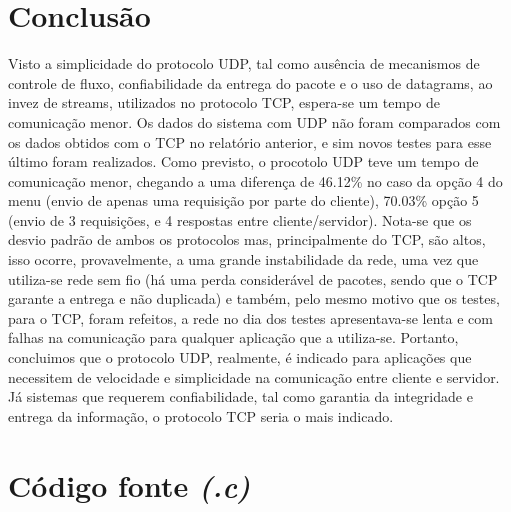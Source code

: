 \documentclass[a4paper,10pt]{article}
\begin{document}
\section{Conclusão}
Visto a simplicidade do protocolo UDP, tal como ausência de mecanismos de controle de fluxo, confiabilidade da entrega do pacote e o uso de datagrams, ao invez de 
streams, utilizados no protocolo TCP, espera-se um tempo de comunicação menor. Os dados do sistema com UDP não foram comparados com os dados obtidos com o TCP no 
relatório anterior, e sim novos testes para esse último foram realizados. Como previsto, o procotolo UDP teve um tempo de comunicação menor, chegando a uma 
diferença de 46.12\% no caso da opção 4 do menu (envio de apenas uma requisição por parte do cliente), 70.03\% opção 5 (envio de 3 requisições, e 4 respostas entre cliente/servidor). Nota-se que os desvio padrão de ambos os protocolos mas, principalmente do TCP, são altos, isso ocorre, provavelmente, a uma grande instabilidade
da rede, uma vez que utiliza-se rede sem fio (há uma perda considerável de pacotes, sendo que o TCP garante a entrega e não duplicada) e também, pelo mesmo motivo 
que os testes, para o TCP, foram refeitos, a rede no dia dos testes apresentava-se lenta e com falhas na comunicação para qualquer aplicação que a utiliza-se.
Portanto, concluimos que o protocolo UDP, realmente, é indicado para aplicações que necessitem de velocidade e simplicidade na comunicação entre cliente e servidor.
Já sistemas que requerem confiabilidade, tal como garantia da integridade e entrega da informação, o protocolo TCP seria o mais indicado.
\newpage
\section{Código fonte \textit{(.c)}}
\end{document}
